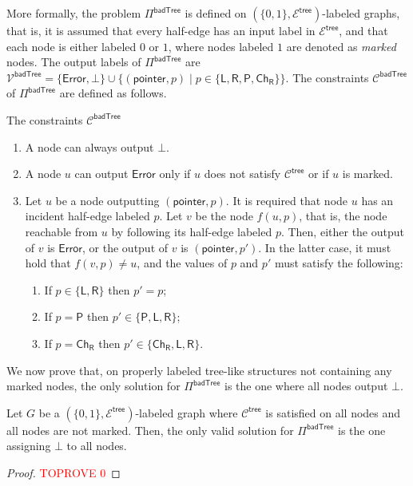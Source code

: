 \documentclass[11pt]{article}
\newcommand{\lparent}{\mathsf {P}}
\newcommand{\lleft}{\mathsf {L}}
\newcommand{\lright}{\mathsf {R}}
\newcommand{\lrch}{\ensuremath{\mathsf {Ch_R}}}
\newcommand{\lerror}{\mathsf {Error}}
\newcommand{\ltreelike}{\mathsf {tree}}
\newcommand{\lpointer}{\mathsf {pointer}}
\newcommand{\lbadtree}{\mathsf {badTree}}
\begin{document}
More formally, the problem $\Pi^{\lbadtree}$ is defined on $(\{0,1\},\mathcal{E^\ltreelike})$-labeled graphs, that is, it is assumed that every half-edge has an input label in $\mathcal{E^\ltreelike}$, and that each node is either labeled $0$ or $1$, where nodes labeled $1$ are denoted as \emph{marked} nodes.
The output labels of $\Pi^{\lbadtree}$ are $\mathcal{V^\lbadtree} = \{\lerror, \bot\} \cup \{ (\lpointer,p) \mid p \in \{\lleft,\lright, \lparent,\lrch\} \}$. The constraints $\mathcal{C}^{\lbadtree}$ of $\Pi^{\lbadtree}$ are defined as follows.

\begin{myframe}{The constraints $\mathcal{C}^{\lbadtree}$}
\begin{enumerate}
	\item A node can always output $\bot$.\label{constr:pibad-bot}
	\item A node $u$ can output $\lerror$ only if $u$ does not satisfy $\mathcal{C}^{\ltreelike}$ or if $u$ is marked.\label{constr:noerror}
	\item Let $u$ be a node outputting $(\lpointer,p)$. It is required that node $u$ has an incident half-edge labeled $p$. Let $v$ be the node $f(u,p)$, that is, the node reachable from $u$ by following its half-edge labeled $p$. Then, either the output of $v$ is $\lerror$, or the output of $v$ is $(\lpointer,p')$. In the latter case, it must hold that $f(v,p) \neq u$, and the values of $p$ and $p'$ must satisfy the following:\label{constr:pointers}
	\begin{enumerate}
		\item If $p \in\{\lleft, \lright\} $ then $p' = p$;
		\item If $p = \lparent$ then $p' \in \{\lparent, \lleft,\lright\}$;
		\item If $p = \lrch$ then $p' \in \{\lrch, \lleft, \lright\}$.
	\end{enumerate}
\end{enumerate}
\end{myframe}

We now prove that, on properly labeled tree-like structures not containing any marked nodes, the only solution for  $\Pi^{\lbadtree}$ is the one where all nodes output $\bot$.
\begin{lemma}\label{lem:valid-sol-for-badtree}
	Let $G$ be a $(\{0,1\},\mathcal{E^\ltreelike})$-labeled graph where $\mathcal{C}^{\ltreelike}$ is satisfied on all nodes and all nodes are not marked. Then, the only valid solution for $\Pi^{\lbadtree}$ is the one assigning $\bot$ to all nodes.
\end{lemma}
\begin{proof}\textcolor{red}{TOPROVE 0}\end{proof}
\end{document}
